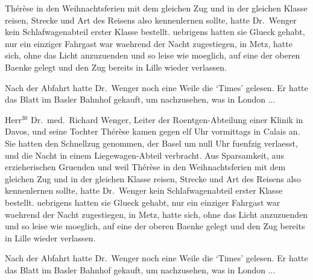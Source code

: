 Th\'e\-r\`ese in den Weihnachtsferien mit dem gleichen
Zug und in der gleichen Klasse reisen, Strecke und
Art des Reisens also kennenlernen sollte, hatte Dr.~Wenger
kein Schlafwagenabteil erster Klasse bestellt.
uebrigens hatten sie Glueck gehabt, nur ein
einziger Fahrgast war waehrend der Nacht zugestiegen,
in Metz, hatte sich, ohne das Licht anzuzuenden
und so leise wie moeglich, auf eine der oberen
Baenke gelegt und den Zug bereits in Lille wieder
verlassen.\par
Nach der Abfahrt hatte Dr.~Wen\-ger noch eine
Weile die `Times' gelesen. Er hatte das Blatt im
Basler Bahnhof gekauft, um nachzusehen, was in London ...\par
Herr$^{30}$ Dr.~med.~Richard Wenger, Leiter der Roent\-gen-Ab\-tei\-lung
einer Klinik in Davos, und seine
Tochter Th\'e\-r\`ese kamen gegen elf Uhr vormittags
in Calais an. Sie hatten den Schnellzug genommen,
der Basel um null Uhr fuenfzig verlaesst, und die
Nacht in einem Liege\-wagen-Abteil verbracht.
Aus Sparsamkeit, aus erzieherischen
Gruenden und weil
Th\'e\-r\`ese in den Weihnachtsferien mit dem gleichen
Zug und in der gleichen Klasse reisen, Strecke und
Art des Reisens also kennenlernen sollte, hatte Dr.~Wenger
kein Schlafwagenabteil erster Klasse bestellt.
uebrigens hatten sie Glueck gehabt, nur ein
einziger Fahrgast war waehrend der Nacht zugestiegen,
in Metz, hatte sich, ohne das Licht anzuzuenden
und so leise wie moeglich, auf eine der oberen
Baenke gelegt und den Zug bereits in Lille wieder
verlassen.\par
Nach der Abfahrt hatte Dr.~Wen\-ger noch eine
Weile die `Times' gelesen. Er hatte das Blatt im
Basler Bahnhof gekauft, um nachzusehen, was in London ...\par
